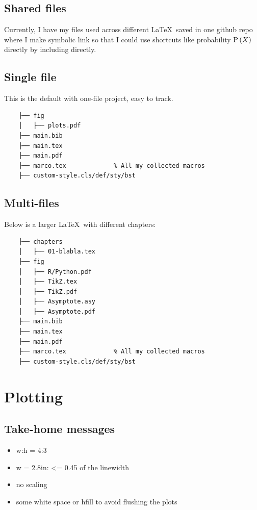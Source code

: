 \documentclass[aos,preprint]{imsart}
\begin{document}
\subsection{Shared files}

Currently, I have my files used across different \LaTeX\ saved in one
github repo where I make symbolic link so that I could use shortcuts like probability
$\operatorname{\mathrm{P}} \left( {X} \right)$ directly by including directly.

\subsection{Single file}

This is the default with one-file project, easy to track.

\begin{Verbatim}
	├── fig
	│   ├── plots.pdf
	├── main.bib
	├── main.tex
	├── main.pdf
	├── marco.tex             % All my collected macros
	├── custom-style.cls/def/sty/bst
\end{Verbatim}

\subsection{Multi-files}

Below is a larger \LaTeX\ with different chapters:

\begin{Verbatim}
	├── chapters
	│   ├── 01-blabla.tex
	├── fig
	│   ├── R/Python.pdf
	│   ├── TikZ.tex
	│   ├── TikZ.pdf
	│   ├── Asymptote.asy
	│   ├── Asymptote.pdf
	├── main.bib
	├── main.tex
	├── main.pdf
	├── marco.tex             % All my collected macros
	├── custom-style.cls/def/sty/bst
\end{Verbatim}


\newpage

\section{Plotting}

\subsection{Take-home messages}

\begin{itemize}
	\item w:h = 4:3
	\item w = 2.8in: <= 0.45 of the linewidth
	\item no scaling
	\item some white space or hfill to avoid flushing the plots
\end{itemize}
\end{document}
